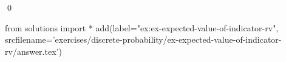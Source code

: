 
\begin{ex} 
  \label{ex:ex-expected-value-of-indicator-rv}
  
  \qed
\end{ex} 
\begin{python0}
from solutions import *
add(label="ex:ex-expected-value-of-indicator-rv",
    srcfilename='exercises/discrete-probability/ex-expected-value-of-indicator-rv/answer.tex') 
\end{python0}
